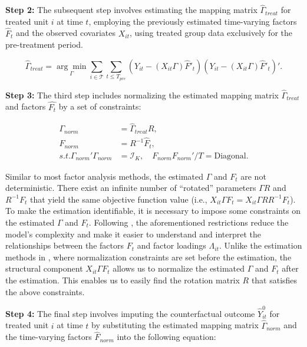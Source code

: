 \documentclass[12pt]{article}
\begin{document}
\textbf{Step 2:} The subsequent step involves estimating the mapping matrix $\hat{\Gamma}_{treat}$ for treated unit $i$ at time $t$, employing the previously estimated time-varying factors $\hat{F}_t$ and the observed covariates $X_{it}$, using treated group data exclusively for the pre-treatment period.

\begin{equation}
\hat{\Gamma}_{treat} = \underset{\Gamma}{\arg\min} \sum_{i \in \mathcal{T}} \sum_{t \leq T_{pre}} \left( Y_{it} - (X_{it} \Gamma) \hat{F}'_{t} \right) \left( Y_{it} - (X_{it} \Gamma) \hat{F}'_{t} \right)'.
\end{equation}

\textbf{Step 3:} The third step includes normalizing the estimated mapping matrix $\hat{\Gamma}_{treat}$ and factors $\hat{F_t}$ by a set of constraints:

\begin{equation}
\label{eqn: normalization}
\begin{aligned}
\Gamma_{norm} &= \hat{\Gamma}_{treat} R, \\
F_{norm} &= R^{-1} \hat{F}_t, \\
s.t. \Gamma_{norm}'\Gamma_{norm} &= \mathcal{I}_K, \quad F_{norm} F_{norm}'/T = \text{Diagonal}.
\end{aligned}
\end{equation}

Similar to most factor analysis methods, the estimated $\Gamma$ and $F_t$ are not deterministic. There exist an infinite number of ``rotated'' parameters $\Gamma R$ and $R^{-1}F_t$ that yield the same objective function value (i.e., $X_{it} \Gamma F_t = X_{it} \Gamma R R^{-1} F_t$). To make the estimation identifiable, it is necessary to impose some constraints on the estimated $\Gamma$ and $F_t$. Following \cite{connor1993test, stock2002forecasting, bai2002determining}, the aforementioned restrictions reduce the model's complexity and make it easier to understand and interpret the relationships between the factors $F_t$ and factor loadings $\Lambda_{it}$. Unlike the estimation methods in \cite{bai2009panel,xu2017generalized}, where normalization constraints are set before the estimation, the structural component $X_{it} \Gamma F_t$ allows us to normalize the estimated $\Gamma$ and $F_t$ after the estimation. This enables us to easily find the rotation matrix $R$ that satisfies the above constraints.

\textbf{Step 4:} The final step involves imputing the counterfactual outcome $\hat{Y}_{it}^0$ for treated unit $i$ at time $t$ by substituting the estimated mapping matrix $\hat{\Gamma}_{norm}$ and the time-varying factors $\hat{F}_{norm}$ into the following equation:
\end{document}

